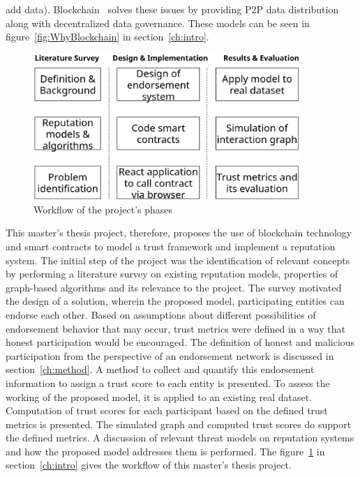 add data). Blockchain~\cite{atzori2015blockchain} solves these issues by
providing P2P data distribution along with decentralized data governance.
These models can be seen in figure~\ref{fig:WhyBlockchain} in
section~\ref{ch:intro}. \par
\begin{figure}
	\begin{center}
		\includegraphics[width=0.9\textwidth]{Images/workflow.eps}
		\caption{Workflow of the project's phases}
		\label{fig:thesisSteps}
	\end{center}
\end{figure}
This master’s thesis project, therefore, proposes the use of blockchain
technology and smart contracts to model a trust framework and implement a
reputation system. The initial step of the project was the identification of
relevant concepts by performing a literature survey on existing reputation
models, properties of graph-based algorithms and its relevance to the project.
The survey motivated the design of a solution, wherein the proposed model,
participating entities can endorse each other. Based on assumptions about
different possibilities of endorsement behavior that may occur, trust metrics
were defined in a way that honest participation would be encouraged. The
definition of honest and malicious participation from the perspective of an
endorsement network is discussed in section~\ref{ch:method}. A method to
collect and quantify this endorsement information to assign a trust score to
each entity is presented. To assess the working of the proposed model, it is
applied to an existing real dataset. Computation of trust scores for each
participant based on the defined trust metrics is presented. The simulated
graph and computed trust scores do support the defined metrics. A discussion of
relevant threat models on reputation systems and how the proposed model
addresses them is performed. The figure~\ref{fig:thesisSteps} in
section~\ref{ch:intro} gives the workflow of this master’s thesis project. \par


